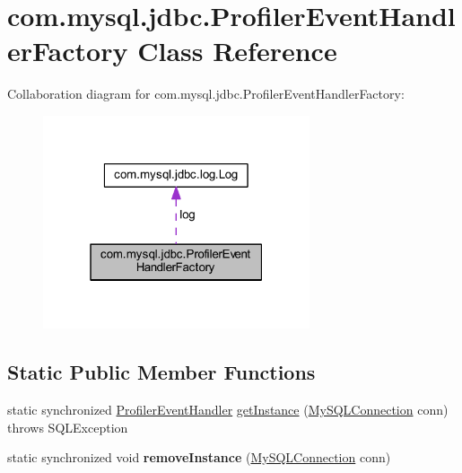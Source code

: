 \hypertarget{classcom_1_1mysql_1_1jdbc_1_1_profiler_event_handler_factory}{}\section{com.\+mysql.\+jdbc.\+Profiler\+Event\+Handler\+Factory Class Reference}
\label{classcom_1_1mysql_1_1jdbc_1_1_profiler_event_handler_factory}


Collaboration diagram for com.\+mysql.\+jdbc.\+Profiler\+Event\+Handler\+Factory\+:
\nopagebreak
\begin{figure}[H]
\begin{center}
\leavevmode
\includegraphics[width=223pt]{classcom_1_1mysql_1_1jdbc_1_1_profiler_event_handler_factory__coll__graph}
\end{center}
\end{figure}
\subsection*{Static Public Member Functions}
\begin{DoxyCompactItemize}
\item 
static synchronized \mbox{\hyperlink{interfacecom_1_1mysql_1_1jdbc_1_1profiler_1_1_profiler_event_handler}{Profiler\+Event\+Handler}} \mbox{\hyperlink{classcom_1_1mysql_1_1jdbc_1_1_profiler_event_handler_factory_a08c2982b1dba0c8012f879d1ea77ba69}{get\+Instance}} (\mbox{\hyperlink{interfacecom_1_1mysql_1_1jdbc_1_1_my_s_q_l_connection}{My\+S\+Q\+L\+Connection}} conn)  throws S\+Q\+L\+Exception 
\item 
\mbox{\label{classcom_1_1mysql_1_1jdbc_1_1_profiler_event_handler_factory_af34775865eb860c0f14d577eee342811}} 
static synchronized void {\bfseries remove\+Instance} (\mbox{\hyperlink{interfacecom_1_1mysql_1_1jdbc_1_1_my_s_q_l_connection}{My\+S\+Q\+L\+Connection}} conn)
\end{DoxyCompactItemize}
